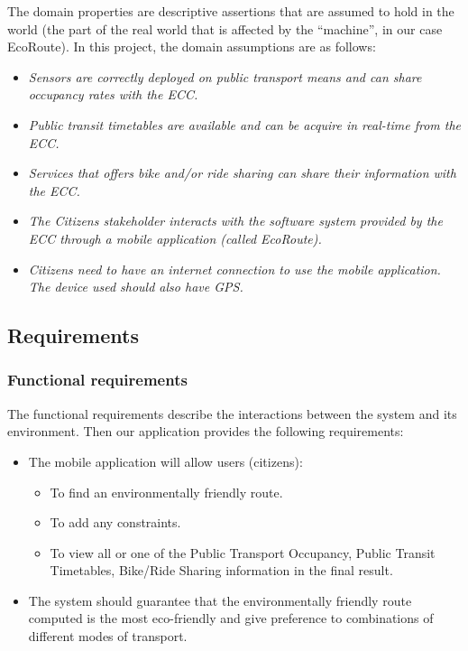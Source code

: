 \documentclass[a4paper]{article}
\newcommand{\dquotes}[1]{``#1''}
\begin{document}
    The domain properties are descriptive assertions that are assumed to hold in the world (the part of the real world that is affected by the \dquotes{machine}, in our case EcoRoute). In this project, the domain assumptions are as follows:
    \begin{itemize}
        \item \emph{Sensors are correctly deployed on public transport means and can share occupancy rates with the ECC.}
        
        \item \emph{Public transit timetables are available and can be acquire in real-time from the ECC.}

        \item \emph{Services that offers bike and/or ride sharing can share their information with the ECC.}
        
        \item \emph{The Citizens stakeholder interacts with the software system provided by the ECC through a mobile application (called EcoRoute).}
        
        \item \emph{Citizens need to have an internet connection to use the mobile application. The device used should also have GPS.}
    \end{itemize}

    \newpage

    \subsection{Requirements}
    
    \subsubsection{Functional requirements}

    The functional requirements describe the interactions between the system and its environment. Then our application provides the following requirements:
    \begin{itemize}
        \item The mobile application will allow users (citizens):
        \begin{itemize}
            \item To find an environmentally friendly route.

            \item To add any constraints.
            
            \item To view all or one of the Public Transport Occupancy, Public Transit Timetables, Bike/Ride Sharing information in the final result.
        \end{itemize}

        \item The system should guarantee that the environmentally friendly route computed is the most eco-friendly and give preference to combinations of different modes of transport.
    \end{itemize}
\end{document}
